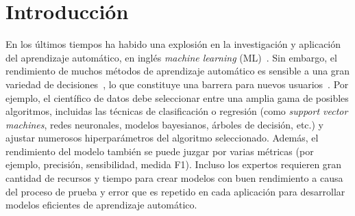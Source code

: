 \documentclass[a4paper,12pt]{article}
\begin{document}
\newpage






\section{Introducción}\label{sec:intro}
\setcounter{page}{1}
En los últimos tiempos ha habido una explosión en la investigación y aplicación del aprendizaje automático, en inglés \textit{machine learning} (ML)~\cite{hey2020machinelearning}. Sin embargo, el rendimiento de muchos métodos de aprendizaje automático es sensible a una gran variedad de decisiones~\cite{dyrmishi2019decision, radwa2019automated}, lo que constituye una barrera para nuevos usuarios~\cite{crisan2021fits}. Por ejemplo, el científico de datos debe seleccionar entre una amplia gama de posibles algoritmos, incluidas las técnicas de clasificación o regresión (como \textit{support vector machines}, redes neuronales, modelos bayesianos, árboles de decisión, etc.) y ajustar numerosos hiperparámetros del algoritmo seleccionado. Además, el rendimiento del modelo también se puede juzgar por varias métricas (por ejemplo, precisión, sensibilidad, medida F1). Incluso los expertos requieren gran cantidad de recursos y tiempo para crear modelos con buen rendimiento a causa del proceso de prueba y error que es repetido en cada aplicación para desarrollar modelos eficientes de aprendizaje automático.
\end{document}
